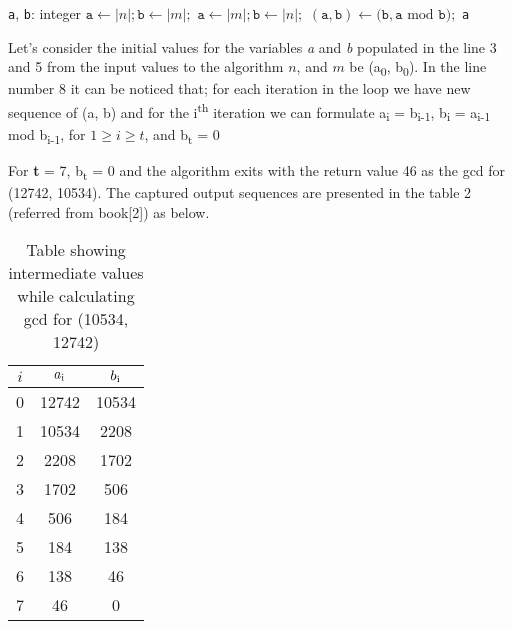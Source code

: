 \documentclass[conference]{IEEEtran}
\newcommand{\var}[1]{\textit{#1}}
\newcommand{\progvar}[1]{\texttt{#1}}
\renewcommand{\mod}{\text{mod}}
\begin{document}

\begin{algorithmic}[1]
\STATE \progvar{a}, \progvar{b}: integer
	\STATE $\progvar{a} \gets |n|; \progvar{b} \gets |m|;$
\ELSE
	\STATE $\progvar{a} \gets |m|; \progvar{b} \gets |n|;$
\ENDIF
\WHILE{$\progvar{b} > 0$ } 
	\STATE $(\progvar{a}, \progvar{b}) \leftarrow (\progvar{b}, \progvar{a}  $ $\mod $ $\progvar{b});$
\ENDWHILE
\RETURN \progvar{a}
\end {algorithmic}

Let's consider the initial values for the variables \var{a} and \var{b} populated in the line 3 and 5 from the input values to the algorithm $n$, and $m$ be (a\textsubscript{0}, b\textsubscript{0}). In the line number 8 it can be noticed that; for each iteration in the loop we have new sequence of (a, b) and for the i\textsuperscript{th} iteration we can formulate a\textsubscript{i} = b\textsubscript{i-1}, b\textsubscript{i} = a\textsubscript{i-1} mod b\textsubscript{i-1}, for $1 \geq i \geq t$, and b\textsubscript{t} = 0

For \textbf{t} = 7, b\textsubscript{t} = 0 and the algorithm exits with the return value 
46 as the gcd for (12742, 10534). The captured output sequences are presented in the table 2 (referred from book[2]) as below.
\begin{table}[!htbp]
\caption{Table showing intermediate values while calculating gcd for (10534, 12742)}
\label{table_org_book_example}
\centering
	\begin{tabular}{c | c | c}
		\hline
		$i$ & $a\textsubscript{i}$ & $b\textsubscript{i}$ \\ [0.5ex] 
		\hline
		0 & 12742 & 10534 \\ 
		1 & 10534 & 2208 \\  
		2 & 2208  & 1702 \\
		3 & 1702  & 506 \\
		4 & 506   & 184 \\
		5 & 184   & 138 \\
		6 & 138   & 46 \\
		7 & 46    & 0
	\end{tabular}
\end{table}
\end{document}

